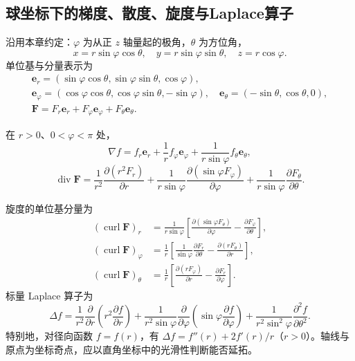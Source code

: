 \documentclass[../main.tex]{subfiles}
\begin{document}
\subsection{球坐标下的梯度、散度、旋度与Laplace算子}
沿用本章约定：$\varphi$ 为从正 $z$ 轴量起的极角，$\theta$ 为方位角，
\[
x=r\sin\varphi\cos\theta,\quad
y=r\sin\varphi\sin\theta,\quad z=r\cos\varphi.
\]
单位基与分量表示为
\begin{gather*}
\bm e_r=(\sin\varphi\cos\theta,\sin\varphi\sin\theta,\cos\varphi),\\
\bm e_\varphi=(\cos\varphi\cos\theta,\cos\varphi\sin\theta,-\sin\varphi),\quad
\bm e_\theta=(-\sin\theta,\cos\theta,0),\\
\bm F=F_r\bm e_r+F_\varphi\bm e_\varphi+F_\theta\bm e_\theta.
\end{gather*}
\par\pagebreak[0]\begin{samepage}
在 $r>0$、$0<\varphi<\pi$ 处，
\[
\nabla f=f_r\bm e_r+\frac1r f_\varphi\bm e_\varphi
+\frac1{r\sin\varphi}f_\theta\bm e_\theta,
\]
\[
\operatorname{div}\bm F
=\frac1{r^2}\frac{\partial(r^2F_r)}{\partial r}
+\frac1{r\sin\varphi}\frac{\partial(\sin\varphi F_\varphi)}{\partial\varphi}
+\frac1{r\sin\varphi}\frac{\partial F_\theta}{\partial\theta}.
\]
\par\end{samepage}\pagebreak[0]
旋度的单位基分量为
\begin{align*}
(\operatorname{curl}\bm F)_r
&=\frac1{r\sin\varphi}\left[
\frac{\partial(\sin\varphi F_\theta)}{\partial\varphi}
-\frac{\partial F_\varphi}{\partial\theta}\right],\\
(\operatorname{curl}\bm F)_\varphi
&=\frac1r\left[\frac1{\sin\varphi}\frac{\partial F_r}{\partial\theta}
-\frac{\partial(rF_\theta)}{\partial r}\right],\\
(\operatorname{curl}\bm F)_\theta
&=\frac1r\left[\frac{\partial(rF_\varphi)}{\partial r}
-\frac{\partial F_r}{\partial\varphi}\right].
\end{align*}
标量 Laplace 算子为
\[
\Delta f=\frac1{r^2}\frac\partial{\partial r}\left(r^2\frac{\partial f}{\partial r}\right)
+\frac1{r^2\sin\varphi}\frac\partial{\partial\varphi}
\left(\sin\varphi\frac{\partial f}{\partial\varphi}\right)
+\frac1{r^2\sin^2\varphi}\frac{\partial^2f}{\partial\theta^2}.
\]
特别地，对径向函数 $f=f(r)$，有 $\Delta f=f''(r)+2f'(r)/r$（$r>0$）。轴线与原点为坐标奇点，应以直角坐标中的光滑性判断能否延拓。
\end{document}

